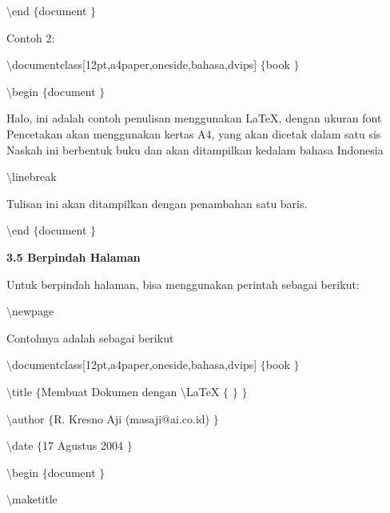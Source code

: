 \begin{itemize}
{\fontsize{10pt}{10pt}\selectfont  $  \setminus  $end $  \{  $document $  \}  $} \par
\vspace{10pt}
Contoh 2: \par
{\fontsize{10pt}{10pt}\selectfont  $  \setminus  $documentclass[12pt,a4paper,oneside,bahasa,dvips] $  \{  $book $  \}  $} \par
{\fontsize{10pt}{10pt}\selectfont  $  \setminus  $begin $  \{  $document $  \}  $} \par
\vspace{10pt}
{\fontsize{10pt}{10pt}\selectfont Halo, ini adalah contoh penulisan menggunakan LaTeX, dengan ukuran font Pencetakan akan menggunakan kertas A4, yang akan dicetak dalam satu sis Naskah ini berbentuk buku dan akan ditampilkan kedalam bahasa Indonesia} \par
\vspace{10pt}
{\fontsize{10pt}{10pt}\selectfont  $  \setminus  $linebreak} \par
{\fontsize{10pt}{10pt}\selectfont Tulisan ini akan ditampilkan dengan penambahan satu baris.} \par
{\fontsize{10pt}{10pt}\selectfont  $  \setminus  $end $  \{  $document $  \}  $}
 \par
\vspace{12pt}
\textbf{3.5 Berpindah Halaman}
 \par
Untuk berpindah halaman, bisa menggunakan perintah sebagai berikut: \par
{\fontsize{10pt}{10pt}\selectfont  $  \setminus  $newpage} \par
\vspace{9pt}
Contohnya adalah sebagai berikut \par
{\fontsize{10pt}{10pt}\selectfont  $  \setminus  $documentclass[12pt,a4paper,oneside,bahasa,dvips] $  \{  $book $  \}  $} \par
{\fontsize{10pt}{10pt}\selectfont  $  \setminus  $title $  \{  $Membuat Dokumen dengan  $  \setminus  $LaTeX $  \{  $ $  \}  $ $  \}  $} \par
{\fontsize{10pt}{10pt}\selectfont  $  \setminus  $author $  \{  $R. Kresno Aji (masaji@ai.co.id) $  \}  $} \par
{\fontsize{10pt}{10pt}\selectfont  $  \setminus  $date $  \{  $17 Agustus 2004 $  \}  $} \par
{\fontsize{10pt}{10pt}\selectfont  $  \setminus  $begin $  \{  $document $  \}  $} \par
{\fontsize{10pt}{10pt}\selectfont  $  \setminus  $maketitle} \par

\end{itemize}
